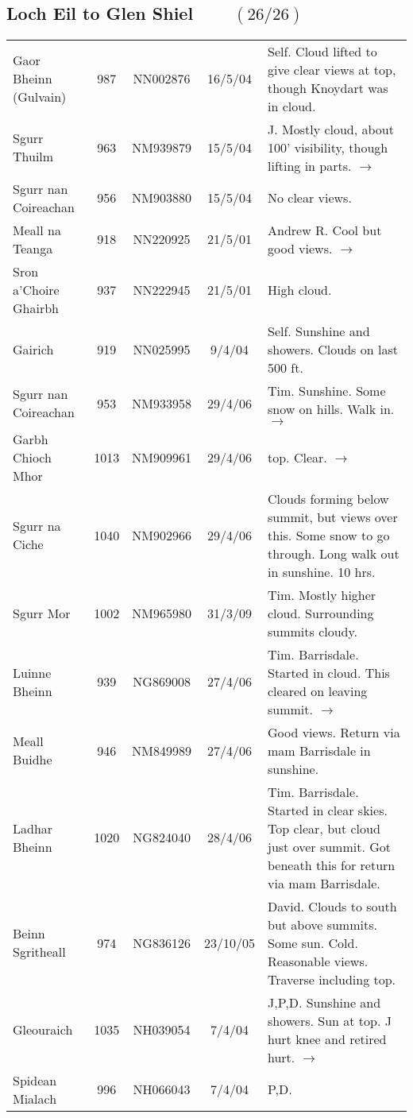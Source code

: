 \documentclass[10pt,a4paper]{article}
\begin{document}
\subsection*{Loch Eil to Glen Shiel $\qquad (26/26)$}

\begin{tabular}{lcccp{6cm}}
Gaor Bheinn (Gulvain) & 987  & NN002876 &16/5/04&Self. Cloud lifted to give clear views at top, though
Knoydart was in cloud.   \\
Sgurr Thuilm & 963  & NM939879 &15/5/04&J. Mostly cloud, about 100' visibility, though
lifting in parts. $\rightarrow$\\
Sgurr nan Coireachan & 956 & NM903880& 15/5/04& No clear views.   \\
Meall na Teanga & 918 & NN220925  &21/5/01& Andrew R. Cool but good views. $\rightarrow$  \\
Sron a'Choire Ghairbh & 937 & NN222945 &21/5/01& High cloud.\\
Gairich & 919 & NN025995&9/4/04&Self. Sunshine and showers. Clouds on last 500 ft. \\
Sgurr nan Coireachan & 953 & NM933958&29/4/06&Tim. Sunshine. Some snow on hills. Walk in.  $\rightarrow$\\
Garbh Chioch Mhor  & 1013  & NM909961 &29/4/06&top. Clear.   $\rightarrow$\\
Sgurr na Ciche & 1040  & NM902966& 29/4/06&Clouds forming below
summit, but views over this. Some snow to go through. Long
walk out in sunshine. 10 hrs.\\
Sgurr Mor & 1002 & NM965980 &31/3/09&Tim. Mostly higher cloud. Surrounding summits cloudy.\\
Luinne Bheinn & 939 & NG869008&27/4/06&Tim. Barrisdale. Started in
cloud. This cleared on leaving summit.
$\rightarrow$\\
Meall Buidhe & 946  & NM849989 & 27/4/06& Good views. Return via mam Barrisdale in sunshine.\\
Ladhar Bheinn  & 1020 & NG824040 &28/4/06&Tim. Barrisdale. Started
in clear skies. Top clear, but
cloud just over summit. Got beneath this for return via mam Barrisdale.\\
Beinn Sgritheall & 974  & NG836126&23/10/05&David. Clouds to south
but above summits. Some sun.
Cold. Reasonable views. Traverse including top. \\
Gleouraich  & 1035  & NH039054 &7/4/04&J,P,D. Sunshine and showers. Sun at top.
J hurt knee and retired hurt. $\rightarrow$\\
Spidean Mialach & 996  & NH066043& 7/4/04&P,D.  \\

\end{tabular}
\end{document}
